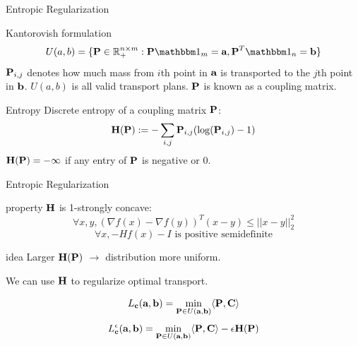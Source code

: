 \documentclass{beamer}
\renewcommand{\b}{\textbf}
\newcommand{\mb}{\mathbb}
\newcommand{\mbm}{\mathbbm}
\newcommand{\set}[1]{\{#1\}}
\newcommand{\grad}{\nabla}
\begin{document}
\begin{frame}{Entropic Regularization} 
  \begin{block}{Kantorovish formulation}
    \[U(a, b) = \set{\b P\in \mb R_+^{n\times m} : \b P \mbm 1_m = \b a, \b P^T
        \mbm 1_n = \b b} \]
    $\b P_{i,j}$ denotes how much mass from $i$th point in $\b a$ is transported
    to the $j$th point in $\b b$. $U(a, b)$ is all valid transport plans. $\b P$
    is known as a coupling matrix.
  \end{block}

  \begin{block}{Entropy}
    Discrete entropy of a coupling matrix $\b P$:
    \[\b H(\b P) := -\sum_{i, j} \b P_{i,j}(\log(\b P_{i, j})-1)\]
    $\b H(\b P) = -\infty$ if any entry of $\b P$ is negative or $0$.
  \end{block}
\end{frame}


\begin{frame}{Entropic Regularization} 
  \begin{block}{property}
     $\b H$ is 1-strongly concave:
      \[\forall x,y, (\grad f(x) - \grad f(y))^T (x-y) \leq ||x-y||_2^2\]
      \[\forall x, -Hf(x) - I \mbox{ is positive semidefinite}\]
  \end{block}
  \begin{block}{idea}
    Larger $\b H(\b P)$ $\rightarrow$ distribution more uniform.

    We can use $\b H$ to regularize optimal transport.
    
    \[L_{\b c}(\b a,\b b) = \min_{\b P\in U(\b a, \b b)}\langle {\b P, \b C} \rangle\]
    \[L_{\b c}^\epsilon(\b a,\b b) = \min_{\b P\in U(\b a, \b b)}\langle {\b P,
        \b C} \rangle - \epsilon\b H(\b P)\]
  \end{block}
\end{frame}
\end{document}
